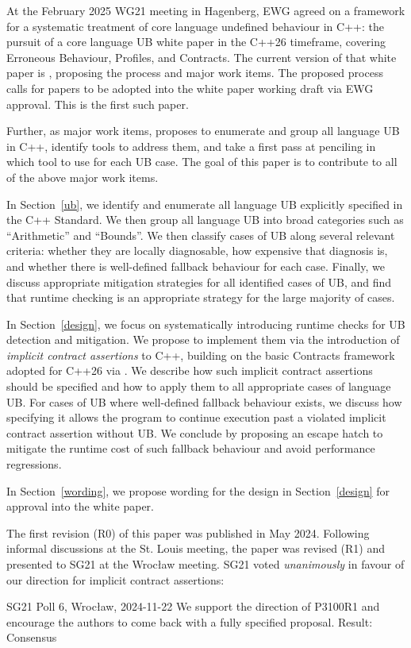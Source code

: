 At the February 2025 WG21 meeting in Hagenberg, EWG agreed on a framework for a systematic
treatment of core language undefined behaviour in C++: the pursuit of a core language UB white paper in the C++26 timeframe, covering Erroneous Behaviour, Profiles, and Contracts. The current version of that white paper is \cite{P3656R1}, proposing the process and major work items. The proposed process calls for papers to be adopted into the white paper working draft via EWG approval. This is the first such paper.

Further, as major work items, \cite{P3656R1} proposes to enumerate and group all language UB in C++, identify tools to address them, and take a first pass at penciling in which tool to use for each UB case. The goal of this paper is to contribute to all of the above major work items.

In Section~\ref{ub}, we identify and enumerate all language UB explicitly specified in the C++ Standard. We then group all language UB into broad categories such as ``Arithmetic'' and ``Bounds''. We then classify cases of UB along several relevant criteria: whether they are locally diagnosable, how expensive that diagnosis is, and whether there is well-defined fallback behaviour for each case. Finally, we discuss appropriate mitigation strategies for all identified cases of UB, and find that runtime checking is an appropriate strategy for the large majority of cases.

In Section~\ref{design}, we focus on systematically introducing runtime checks for UB detection and mitigation. We propose to implement them via the introduction of \emph{implicit contract assertions} to C++, building on the basic Contracts framework adopted for C++26 via \cite{P2900R14}. We describe how such implicit contract assertions should be specified and how to apply them to all appropriate cases of language UB. For cases of UB where well-defined fallback behaviour exists, we discuss how specifying it allows the program to continue execution past a violated implicit contract assertion without UB. We conclude by proposing an escape hatch to mitigate the runtime cost of such fallback behaviour and avoid performance regressions.

In Section~\ref{wording}, we propose wording for the design in Section~\ref{design} for approval into the white paper.

The first revision (R0) of this paper was published in May 2024. Following informal discussions at the St. Louis meeting, the paper was revised (R1) and presented to SG21 at the Wroc{\l}aw meeting. SG21 voted \emph{unanimously} in favour of our direction for implicit contract assertions:
\vspace{2mm}
\begin{wgpoll}{{SG21 Poll 6, Wroc{\l}aw, 2024-11-22}}
We support the direction of P3100R1 and encourage the authors to come back with a fully specified proposal.
Result: Consensus
\end{wgpoll}
\vspace{2mm}

